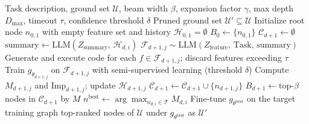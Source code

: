\begin{algorithm}[t]
\caption{\llm}
\label{alg:llm2prune}
\begin{algorithmic}[1]
\Require Task description, ground set $\mathcal{U}$, beam width $\beta$, expansion factor $\gamma$, max depth $D_{\max}$, timeout $\tau$, confidence threshold $\delta$
\Ensure Pruned ground set $\mathcal{U}' \subseteq \mathcal{U}$
\State Initialize root node $n_{0,1}$ with empty feature set and history $\mathcal{H}_{0,1} = \emptyset$
\State $B_0 \leftarrow \{n_{0,1}\}$
    \State $\mathcal{C}_{d+1} \leftarrow \emptyset$
     
        \State $\mathrm{summary} \leftarrow \mathrm{LLM}(Z_{\mathrm{summary}},\, \mathcal{H}_{d,i})$
            \State $\mathcal{F}_{d+1,j} \sim \mathrm{LLM}(Z_{\mathrm{feature}},\, \text{Task},\, \mathrm{summary})$
            \State Generate and execute code for each $f \in \mathcal{F}_{d+1,j}$; discard features exceeding $\tau$
            \State Train $g_{\theta_{d+1,j}}$ on $\mathcal{F}_{d+1,j}$ with semi-supervised learning (threshold $\delta$)
            \State Compute $M_{d+1,j}$ and $\mathrm{Imp}_{d+1,j}$; update $\mathcal{H}_{d+1,j}$
            \State $\mathcal{C}_{d+1} \leftarrow \mathcal{C}_{d+1} \cup \{n_{d+1,j}\}$
        \EndFor
    \EndFor
    \State $B_{d+1} \leftarrow \text{top-}\beta$ nodes in $\mathcal{C}_{d+1}$ by $M$ 
\EndFor
\State $n^{\mathrm{best}} \leftarrow \arg\max_{n_{d,i} \in \mathcal{T}} M_{d,i}$
\State Fine-tune $g_{\theta^{\mathrm{best}}}$ on the target training graph
\State \Return top-ranked nodes of $\mathcal{U}$ under $g_{\theta^{\mathrm{best}}}$ as $\mathcal{U}'$
\end{algorithmic}
\end{algorithm}












 

